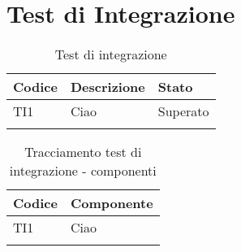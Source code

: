 \documentclass[PianoDiQualifica.tex]{subfiles}
\begin{document}
\chapter{Test di Integrazione}

\begin{longtable}[H]{P{2cm}P{8.5cm}P{3cm}}
	\color{CHeaderText}\textbf{Codice} & 
	\color{CHeaderText}\textbf{Descrizione} & 
	\color{CHeaderText}\textbf{Stato}\\
	\endhead
	TI1 & Ciao & Superato \\ 
	\hiderowcolors
	\caption{Test di integrazione}
\end{longtable}

\begin{longtable}[H]{P{2cm}P{11.5cm}}
	\color{CHeaderText}\textbf{Codice} & 
	\color{CHeaderText}\textbf{Componente} \\
	\endhead
	TI1 & Ciao \\ 
	\hiderowcolors
	\caption{Tracciamento test di integrazione - componenti}
\end{longtable}
\end{document}
